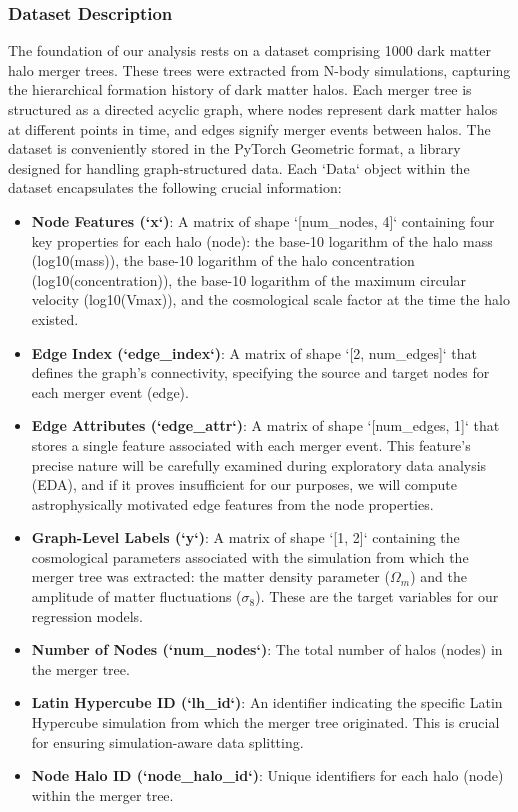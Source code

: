 \documentclass[twocolumn]{aastex631}
\begin{document}
\subsubsection{Dataset Description}
The foundation of our analysis rests on a dataset comprising 1000 dark matter halo merger trees. These trees were extracted from N-body simulations, capturing the hierarchical formation history of dark matter halos. Each merger tree is structured as a directed acyclic graph, where nodes represent dark matter halos at different points in time, and edges signify merger events between halos. The dataset is conveniently stored in the PyTorch Geometric format, a library designed for handling graph-structured data. Each `Data` object within the dataset encapsulates the following crucial information:
\begin{itemize}
    \item \textbf{Node Features (`x`)}: A matrix of shape `[num\_nodes, 4]` containing four key properties for each halo (node): the base-10 logarithm of the halo mass (log10(mass)), the base-10 logarithm of the halo concentration (log10(concentration)), the base-10 logarithm of the maximum circular velocity (log10(Vmax)), and the cosmological scale factor at the time the halo existed.
    \item \textbf{Edge Index (`edge\_index`)}: A matrix of shape `[2, num\_edges]` that defines the graph's connectivity, specifying the source and target nodes for each merger event (edge).
    \item \textbf{Edge Attributes (`edge\_attr`)}: A matrix of shape `[num\_edges, 1]` that stores a single feature associated with each merger event. This feature's precise nature will be carefully examined during exploratory data analysis (EDA), and if it proves insufficient for our purposes, we will compute astrophysically motivated edge features from the node properties.
    \item \textbf{Graph-Level Labels (`y`)}: A matrix of shape `[1, 2]` containing the cosmological parameters associated with the simulation from which the merger tree was extracted: the matter density parameter ($\Omega_m$) and the amplitude of matter fluctuations ($\sigma_8$). These are the target variables for our regression models.
    \item \textbf{Number of Nodes (`num\_nodes`)}: The total number of halos (nodes) in the merger tree.
    \item \textbf{Latin Hypercube ID (`lh\_id`)}: An identifier indicating the specific Latin Hypercube simulation from which the merger tree originated. This is crucial for ensuring simulation-aware data splitting.
    \item \textbf{Node Halo ID (`node\_halo\_id`)}: Unique identifiers for each halo (node) within the merger tree.
\end{itemize}
\end{document}
